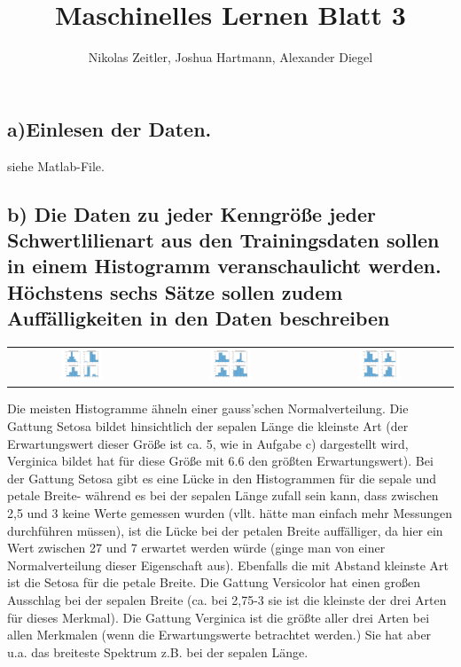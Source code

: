 \documentclass{scrartcl}
\author{Nikolas Zeitler, Joshua Hartmann, Alexander Diegel}
\title{Maschinelles Lernen Blatt 3}
\begin{document}
\maketitle
\subsection*{a)Einlesen der Daten.} siehe Matlab-File.
\subsection*{b) Die Daten zu jeder Kenngröße jeder Schwertlilienart aus den Trainingsdaten sollen in einem Histogramm veranschaulicht werden. Höchstens sechs Sätze sollen zudem Auffälligkeiten in den Daten beschreiben}

\begin{tabular}{ccc}
\includegraphics[width=0.3\textwidth]{plots/trainSetosa.jpg}  &
\includegraphics[width=0.3\textwidth]{plots/trainVersicolor.jpg} & 
\includegraphics[width=0.3\textwidth]{plots/trainVerginica.jpg} 

\end{tabular}
	
Die meisten Histogramme ähneln einer gauss'schen Normalverteilung.
Die Gattung Setosa bildet hinsichtlich der sepalen Länge die kleinste Art (der Erwartungswert dieser Größe ist ca. 5, wie in Aufgabe c) dargestellt wird, Verginica bildet hat für diese Größe mit 6.6 den größten Erwartungswert). 
Bei der Gattung Setosa gibt es eine Lücke in den Histogrammen für die sepale und petale Breite- während es bei der sepalen Länge zufall sein kann, dass zwischen 2,5 und 3 keine Werte gemessen wurden (vllt. hätte man einfach mehr Messungen durchführen müssen), ist die Lücke bei der petalen Breite auffälliger, da hier ein Wert zwischen 27 und 7 erwartet werden würde (ginge man von einer Normalverteilung dieser Eigenschaft aus). 
Ebenfalls die mit Abstand kleinste Art ist die Setosa für die petale Breite.
Die Gattung Versicolor hat einen großen Ausschlag bei der sepalen Breite (ca. bei 2,75-3 sie ist die kleinste der drei Arten für dieses Merkmal). 
Die Gattung Verginica ist die größte aller drei Arten bei allen Merkmalen (wenn die Erwartungswerte betrachtet werden.) Sie hat aber u.a. das breiteste Spektrum z.B. bei der sepalen Länge. 
\end{document}
